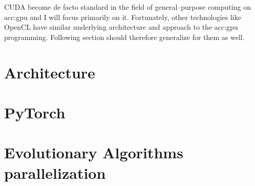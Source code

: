 CUDA become de facto standard in the field of general--purpose computing on \acrshort{acc:gpu} and I will focus primarily on it. Fortunately, other technologies like OpenCL have similar underlying architecture and approach to the \acrshort{acc:gpu} programming. Following section should therefore generalize for them as well.




\section{Architecture}




\section{PyTorch}




\section{Evolutionary Algorithms parallelization}
